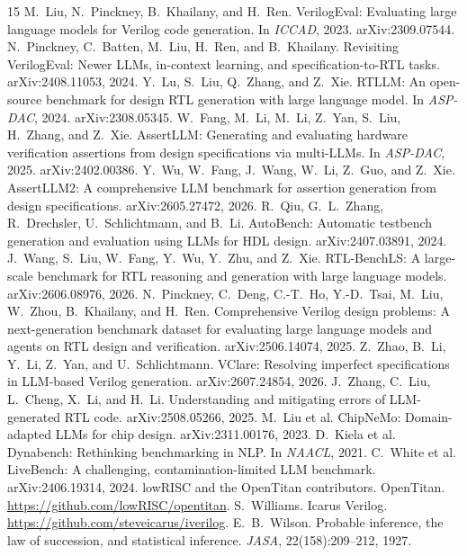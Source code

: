\documentclass[11pt]{article}
\begin{document}
\begin{thebibliography}{15}
 M.~Liu, N.~Pinckney, B.~Khailany, and H.~Ren. VerilogEval: Evaluating large language models for Verilog code generation. In \emph{ICCAD}, 2023. arXiv:2309.07544.
 N.~Pinckney, C.~Batten, M.~Liu, H.~Ren, and B.~Khailany. Revisiting VerilogEval: Newer LLMs, in-context learning, and specification-to-RTL tasks. arXiv:2408.11053, 2024.
 Y.~Lu, S.~Liu, Q.~Zhang, and Z.~Xie. RTLLM: An open-source benchmark for design RTL generation with large language model. In \emph{ASP-DAC}, 2024. arXiv:2308.05345.
 W.~Fang, M.~Li, M.~Li, Z.~Yan, S.~Liu, H.~Zhang, and Z.~Xie. AssertLLM: Generating and evaluating hardware verification assertions from design specifications via multi-LLMs. In \emph{ASP-DAC}, 2025. arXiv:2402.00386.
 Y.~Wu, W.~Fang, J.~Wang, W.~Li, Z.~Guo, and Z.~Xie. AssertLLM2: A comprehensive LLM benchmark for assertion generation from design specifications. arXiv:2605.27472, 2026.
 R.~Qiu, G.~L.~Zhang, R.~Drechsler, U.~Schlichtmann, and B.~Li. AutoBench: Automatic testbench generation and evaluation using LLMs for HDL design. arXiv:2407.03891, 2024.
 J.~Wang, S.~Liu, W.~Fang, Y.~Wu, Y.~Zhu, and Z.~Xie. RTL-BenchLS: A large-scale benchmark for RTL reasoning and generation with large language models. arXiv:2606.08976, 2026.
 N.~Pinckney, C.~Deng, C.-T.~Ho, Y.-D.~Tsai, M.~Liu, W.~Zhou, B.~Khailany, and H.~Ren. Comprehensive Verilog design problems: A next-generation benchmark dataset for evaluating large language models and agents on RTL design and verification. arXiv:2506.14074, 2025.
 Z.~Zhao, B.~Li, Y.~Li, Z.~Yan, and U.~Schlichtmann. VClare: Resolving imperfect specifications in LLM-based Verilog generation. arXiv:2607.24854, 2026.
 J.~Zhang, C.~Liu, L.~Cheng, X.~Li, and H.~Li. Understanding and mitigating errors of LLM-generated RTL code. arXiv:2508.05266, 2025.
 M.~Liu et al. ChipNeMo: Domain-adapted LLMs for chip design. arXiv:2311.00176, 2023.
 D.~Kiela et al. Dynabench: Rethinking benchmarking in NLP. In \emph{NAACL}, 2021.
 C.~White et al. LiveBench: A challenging, contamination-limited LLM benchmark. arXiv:2406.19314, 2024.
 lowRISC and the OpenTitan contributors. OpenTitan. \url{https://github.com/lowRISC/opentitan}.
 S.~Williams. Icarus Verilog. \url{https://github.com/steveicarus/iverilog}.
 E.~B.~Wilson. Probable inference, the law of succession, and statistical inference. \emph{JASA}, 22(158):209--212, 1927.

\end{thebibliography}
\end{document}
